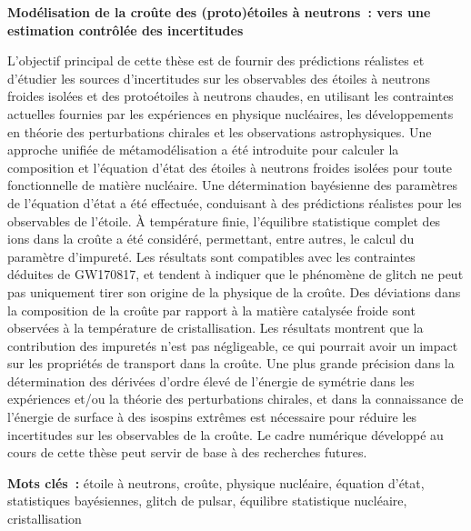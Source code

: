 \begin{changemargin}{-0.2cm}{-1.2cm}
\begin{center}
  \textbf{Modélisation de la croûte des (proto)étoiles à neutrons~: vers une
  estimation contrôlée des incertitudes}
\end{center}

L'objectif principal de cette thèse est de fournir des prédictions réalistes et 
d'étudier les sources d'incertitudes sur les observables des étoiles à 
neutrons froides isolées et des protoétoiles à neutrons chaudes, en 
utilisant les contraintes actuelles fournies par les expériences en physique 
nucléaires, les développements en théorie des perturbations chirales et les 
observations astrophysiques.
Une approche unifiée de métamodélisation a été introduite pour calculer la 
composition et l'équation d'état des étoiles à neutrons froides isolées pour 
toute fonctionnelle de matière nucléaire.
Une détermination bayésienne des paramètres de l'équation d'état a été 
effectuée, conduisant à des prédictions réalistes pour les observables
de l'étoile.
À température finie, l'équilibre statistique complet des ions dans la croûte 
a été considéré, permettant, entre autres, le calcul du paramètre d'impureté.
Les résultats sont compatibles avec les contraintes déduites de GW170817, et 
tendent à indiquer que le phénomène de glitch ne peut pas uniquement tirer son 
origine de la physique de la croûte.
Des déviations dans la composition de la croûte par rapport à la matière 
catalysée froide sont observées à la 
température de cristallisation. Les résultats montrent que la contribution des 
impuretés n'est pas négligeable, ce qui pourrait avoir un impact sur les 
propriétés de transport dans la croûte.
Une plus grande précision dans la détermination des dérivées 
d'ordre élevé de l'énergie de symétrie dans les expériences et/ou la théorie 
des perturbations chirales, et dans la connaissance de l'énergie de surface à 
des isospins extrêmes est nécessaire pour réduire les incertitudes sur les 
observables de la croûte. 
Le cadre numérique développé au cours de cette thèse peut servir de 
base à des recherches futures.

\textbf{Mots clés~:} 
étoile à neutrons, croûte, physique nucléaire, équation d'état, statistiques 
bayésiennes, glitch de pulsar, équilibre statistique nucléaire, cristallisation

\end{changemargin}

\thispagestyle{empty}

